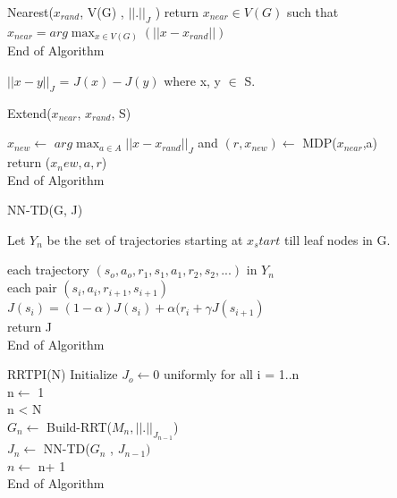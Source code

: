 \documentclass[MTech]{iitmdiss}
\begin{document}
\begin{algorithm}{Nearest($x_{rand}$, V(G) , $|| . ||_J$ )}{
\label{algo:Nearest}
}
return $x_{near} \in V(G)$ such that  $x_{near} = \displaystyle arg\max_{x \in V(G)} (|| x - x_{rand}|| ) $\\
End of Algorithm
\end{algorithm}
$||x - y||_J$ = $J(x) - J(y)$ where x, y $\in$ S.
 
\begin{algorithm}{Extend($x_{near}$, $x_{rand}$, S)}{
\label{algo:Extend}
}

 $x_{new} \leftarrow$  $\displaystyle arg\max_{a \in A} ||x - x_{rand} ||_J $ and $(r,x_{new} ) \leftarrow$ MDP($x_{near}$,a)\\ 
 return ($x_new, a, r$)\\
End of Algorithm
\end{algorithm}

\begin{algorithm}{NN-TD(G, J)}{
\label{algo:NN-TD}
}

Let $Y_n$ be the set of trajectories starting at $x_start$ till leaf nodes in G.

\qfor each trajectory $(s_o, a_o, r_1, s_1, a_1, r_2, s_2, ...)$ in $Y_n$\\
\qfor each pair $(s_i,a_i,r_{i+1}, s_{i+1})$\\
$J(s_i) = (1 - \alpha) J(s_i) + \alpha(r_i + \gamma J(s_{i+1})$\qrof\qrof\\
return J\\
End of Algorithm
\end{algorithm}



\begin{algorithm}{RRTPI(N)}{
\label{algo:RRTPI}
}
Initialize $J_o \leftarrow 0$ uniformly for all i = 1$..$n\\
n$\leftarrow$ 1\\
\qwhile n < N \\
$G_n \leftarrow$ Build-RRT($M_n,|| . ||_{J_{n-1}} $)\\
$J_n \leftarrow$ NN-TD($G_n$ , $J_{n-1})$\\
$n \leftarrow$ n+ 1\qend\\
End of Algorithm
\end{algorithm}
\end{document}
